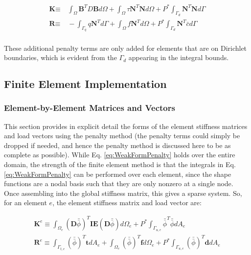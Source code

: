 \documentclass[10pt]{article}
\begin{document}
\begin{equation}
\begin{aligned}
\textbf{K}\equiv&\ \int_{\Omega}\textbf{B}^TD\textbf{B} d\Omega+\int_{\Omega}\tau \textbf{N}^T\textbf{N} d\Omega+P^{*}\int_{\Gamma_d}\textbf{N}^T\textbf{N} d\Gamma\\
\textbf{R}\equiv&\ -\int_{\Gamma_q}q\textbf{N}^Td\Gamma+\int_{\Omega}f\textbf{N}^Td\Omega+P^{*}\int_{\Gamma_d}\textbf{N}^T\bar{c}d\Gamma\\
\end{aligned}
\end{equation}

These additional penalty terms are only added for elements that are on Dirichlet boundaries, which is evident from the \(\Gamma_d\) appearing in the integral bounds.


\subsection{Finite Element Implementation}
\label{sec:FEElement}

\subsubsection{Element-by-Element Matrices and Vectors}

This section provides in explicit detail the forms of the element stiffness matrices and load vectors using the penalty method (the penalty terms could simply be dropped if needed, and hence the penalty method is discussed here to be as complete as possible). While Eq. \eqref{eq:WeakFormPenalty} holds over the entire domain, the strength of the finite element method is that the integrals in Eq. \eqref{eq:WeakFormPenalty} can be performed over each element, since the shape functions are a nodal basis such that they are only nonzero at a single node. Once assembling into the global stiffness matrix, this gives a sparse system. So, for an element \(e\), the element stiffness matrix and load vector are:

\begin{tcolorbox}
\begin{equation}
\label{eq:FEWeakForm_element}
\begin{aligned}
\textbf{K}^e\equiv\int_{\Omega_e}(\textbf{D}\bar{\bar{\phi}})^T\textbf{IE}(\textbf{D}\bar{\bar{\phi}})d\Omega_e +P^{*}\int_{\Gamma_{u,e}}\bar{\bar{\phi}}^T\bar{\bar{\phi}}dA_e\\
\textbf{R}^e\equiv\int_{\Gamma_{t,e}}(\bar{\bar{\phi}})^T\textbf{t}dA_e+\int_{\Omega_e}(\bar{\bar{\phi}})^T\textbf{f}d\Omega_e+P^{*}\int_{\Gamma_{u,e}}(\bar{\bar{\phi}})^T\textbf{d}dA_e\\
\end{aligned}
\end{equation}
\end{tcolorbox}
\end{document}
